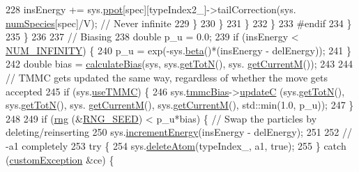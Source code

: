 \begin{DoxyCode}
228                             insEnergy += sys.\hyperlink{classsim_system_ad2e290b5963f132e6a3a56cee35c8e9f}{ppot}[spec][typeIndex2\_]->tailCorrection(sys.
      \hyperlink{classsim_system_a9eea865e6dc1cff377b1e79c4d9c23f0}{numSpecies}[spec]/V); \textcolor{comment}{// Never infinite}
229                         \}
230                     \}
231                 \}
232             \}
233 \textcolor{preprocessor}{    #endif}
234 \textcolor{preprocessor}{}        \}
235     \}
236 
237     \textcolor{comment}{// Biasing}
238     \textcolor{keywordtype}{double} p\_u = 0.0;
239     \textcolor{keywordflow}{if} (insEnergy < \hyperlink{potentials_8h_ab94ab1d09e2291d03fe92a0e24a9d33b}{NUM\_INFINITY}) \{
240         p\_u = exp(-sys.\hyperlink{classsim_system_a3eeec9678902f8d7fce4dad6064aaf4c}{beta}()*(insEnergy - delEnergy));
241     \}
242     \textcolor{keywordtype}{double} bias = \hyperlink{system_8cpp_acfe185adf03db047fd3753c0d788e0e3}{calculateBias}(sys, sys.\hyperlink{classsim_system_a37dd827f4057049763351510147b9f1d}{getTotN}(), sys.
      \hyperlink{classsim_system_a299fe4372e610b554eaaf5f5957b2dbc}{getCurrentM}());
243 
244     \textcolor{comment}{// TMMC gets updated the same way, regardless of whether the move gets accepted}
245     \textcolor{keywordflow}{if} (sys.\hyperlink{classsim_system_aa474a50b6353c8897331b1ab1ce53ab1}{useTMMC}) \{
246         sys.\hyperlink{classsim_system_a13173f45a1e40a5f5a3552b0ebe15b54}{tmmcBias}->\hyperlink{classtmmc_ae067afc5b52af203b9d45f18d9737219}{updateC} (sys.\hyperlink{classsim_system_a37dd827f4057049763351510147b9f1d}{getTotN}(), sys.\hyperlink{classsim_system_a37dd827f4057049763351510147b9f1d}{getTotN}(), sys.
      \hyperlink{classsim_system_a299fe4372e610b554eaaf5f5957b2dbc}{getCurrentM}(), sys.\hyperlink{classsim_system_a299fe4372e610b554eaaf5f5957b2dbc}{getCurrentM}(), std::min(1.0, p\_u));
247     \}
248 
249     \textcolor{keywordflow}{if} (\hyperlink{utilities_8cpp_a0f9542af4b475ac79cb679d7a8d14db0}{rng} (&\hyperlink{global_8h_a3f4e4ea24d5a5c66feae55d1f329c884}{RNG\_SEED}) < p\_u*bias) \{ \textcolor{comment}{// Swap the particles by deleting/reinserting}
250         sys.\hyperlink{classsim_system_a6ad31c08955b80873f865b3069618dcb}{incrementEnergy}(insEnergy - delEnergy);
251 
252         \textcolor{comment}{// -a1 completely}
253         \textcolor{keywordflow}{try} \{
254             sys.\hyperlink{classsim_system_acabf4fc5b5b90bba62e1449ddb3646c6}{deleteAtom}(typeIndex\_, a1, \textcolor{keyword}{true});
255         \} \textcolor{keywordflow}{catch} (\hyperlink{classcustom_exception}{customException} &ce) \{

\end{DoxyCode}

